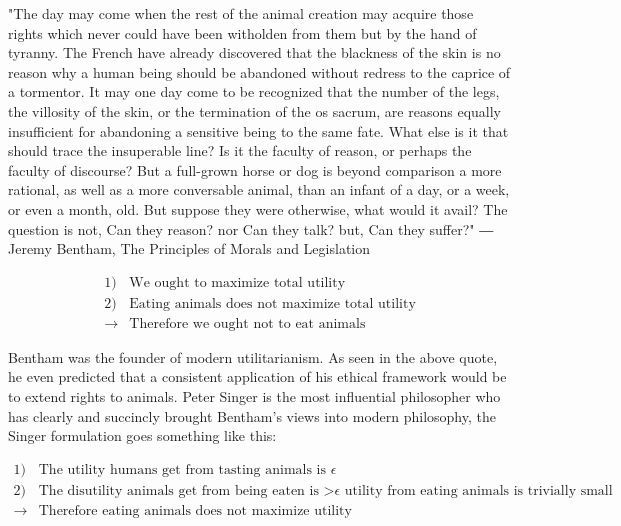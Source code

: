 \begin{tcolorbox}[enhanced,%
  colback=green!25!black!10!white,colframe=green!75!black,title=Principle of utility (10cm),
  drop fuzzy shadow,watermark color=white,watermark text=Fit]
"The day may come when the rest of the animal creation may acquire those
rights which never could have been witholden from them but by the hand of
tyranny. The French have already discovered that the blackness of the skin
is no reason why a human being should be abandoned without redress to the
caprice of a tormentor. It may one day come to be recognized that the
number of the legs, the villosity of the skin, or the termination of the os
sacrum, are reasons equally insufficient for abandoning a sensitive being to
the same fate. What else is it that should trace the insuperable line? Is it the
faculty of reason, or perhaps the faculty of discourse? But a full-grown
horse or dog is beyond comparison a more rational, as well as a more
conversable animal, than an infant of a day, or a week, or even a month,
old. But suppose they were otherwise, what would it avail? The question is
not, Can they reason? nor Can they talk? but, Can they suffer?"
― Jeremy Bentham, The Principles of Morals and Legislation
\end{tcolorbox}

\begin{tcolorbox}[enhanced,%
  colback=green!25!black!10!white,colframe=green!75!black,title=Fit box (5cm),
  drop fuzzy shadow,watermark color=white,watermark text=Fit]
\begin{align*}
1)& \text{We ought to maximize total utility} \\
2)& \text{Eating animals does not maximize total utility} \\
\rightarrow& \text{Therefore we ought not to eat animals}
\end{align*}
\end{tcolorbox}

Bentham was the founder of modern utilitarianism. As seen in the above quote, he even predicted that a consistent application of his ethical framework would be to extend rights to animals. Peter Singer is the most influential philosopher who has clearly and succincly brought Bentham's views into modern philosophy, the Singer formulation goes something like this: 

\begin{tcolorbox}[enhanced,%
  colback=green!25!black!10!white,colframe=green!75!black,title=Fit box (5cm),
  drop fuzzy shadow,watermark color=white,watermark text=Fit]
\begin{align*}
1)& \text{The utility humans get from tasting animals is $\epsilon$} \\
2)& \text{The disutility animals get from being eaten is >$\epsilon$ utility from eating animals is trivially small} \\
\rightarrow& \text{Therefore eating animals does not maximize utility}
\end{align*}
\end{tcolorbox}


